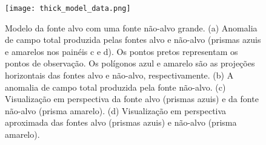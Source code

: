 \pagebreak
\begin{figure}[!htb]
	\centering
	\texttt{[image: thick\_model\_data.png]}
	\caption{Modelo da fonte alvo com uma fonte não-alvo grande.
		(a) Anomalia de campo total produzida pelas fontes alvo e não-alvo
		(prismas azuis e amarelos nos painéis c e d). Os pontos pretos representam os pontos de observação. Os polígonos azul e amarelo são as projeções horizontais das fontes alvo e não-alvo, respectivamente.
		(b) A anomalia de campo total produzida pela fonte não-alvo. 
		(c) Visualização em perspectiva da fonte alvo (prismas azuis) e da fonte não-alvo (prisma amarelo). 
		(d) Visualização em perspectiva aproximada das fontes alvo (prismas azuis) e não-alvo (prisma amarelo).
	}
	\label{fig:thick_model}
\end{figure}
\pagebreak

